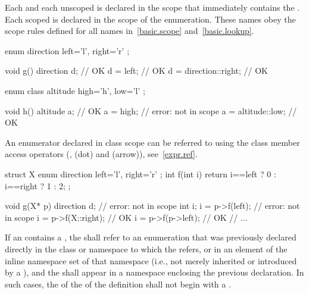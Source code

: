 \pnum
{}%
Each  and each unscoped  is
declared in the scope that immediately contains the .
Each scoped  is declared in the scope of the
enumeration.
These names obey the scope rules defined for all names
in~\ref{basic.scope} and~\ref{basic.lookup}. \begin{example}
\begin{codeblock}
enum direction { left='l', right='r' };

void g()  {
  direction d;                  // OK
  d = left;                     // OK
  d = direction::right;         // OK
}

enum class altitude { high='h', low='l' };

void h()  {
  altitude a;                   // OK
  a = high;                     // error:  not in scope
  a = altitude::low;            // OK
}
\end{codeblock}
\end{example}
%
An enumerator declared in class scope can be referred to using the class
member access operators (\tcode{::},  (dot) and \tcode{->}
(arrow)), see~\ref{expr.ref}.
\begin{example}

\begin{codeblock}
struct X {
  enum direction { left='l', right='r' };
  int f(int i) { return i==left ? 0 : i==right ? 1 : 2; }
};

void g(X* p) {
  direction d;                  // error:  not in scope
  int i;
  i = p->f(left);               // error:  not in scope
  i = p->f(X::right);           // OK
  i = p->f(p->left);            // OK
  // ...
}
\end{codeblock}
\end{example}

\pnum
If an  contains a ,
the  shall refer to an enumeration
that was previously declared directly in the class or namespace
to which the  refers, or
in an element of the inline namespace set
of that namespace (i.e., not merely inherited or introduced by a
), and
the  shall appear in
a namespace enclosing the previous declaration.
In such cases, the 
of the  of the definition
shall not begin with a .

